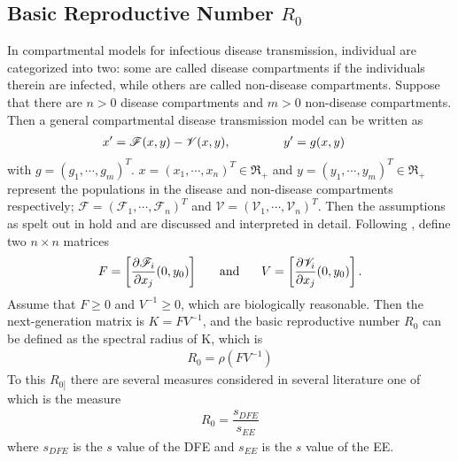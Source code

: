 \subsection{Basic Reproductive Number $ R_{0} $}
In compartmental models for infectious disease transmission, individual are categorized into two: some are called disease compartments if the individuals therein are infected, while others are called non-disease compartments. Suppose that there are $ n > 0 $ disease compartments and $ m > 0 $ non-disease compartments. Then a general compartmental disease transmission model can be written as 
\begin{align}
x' &= \mathscr{F}(x,y) - \mathscr{V}(x,y),\hspace*{1.5cm} y' = g(x,y) \label{NGM1}
\end{align}
with $ g = (g_{1},\cdots, g_{m})^{T} $. $ x = (x_{1},\cdots, x_{n})^{T} \in \Re_{+}$ and $ y = (y_{1},\cdots, y_{m})^{T} \in \Re_{+} $ represent the populations in the disease and non-disease compartments respectively; $ \mathscr{F} = (\mathscr{F}_{1},\cdots, \mathscr{F}_{n})^{T} $ and $ \mathscr{V} = (\mathscr{V}_{1},\cdots, \mathscr{V}_{n})^{T} $. Then the assumptions as spelt out in \parencite{shuai2013global,van2002reproduction,van2008further} hold and are discussed  and interpreted in detail. Following \parencite{van2002reproduction,van2008further}, define two $ n \times n $ matrices
\begin{align}
F = \left[\dfrac{\partial\mathscr{F}_{i}}{\partial x_{j}}(0,y_{0})\right] \hspace*{0.5cm} \text{ and } \hspace*{0.5cm}  V = \left[\dfrac{\partial\mathscr{V}_{i}}{\partial x_{j}}(0,y_{0})\right]. \label{NGM2}
\end{align} 
Assume that $ F \geq 0 $ and $ V^{-1} \geq 0 $, which are biologically reasonable. Then the next-generation matrix is $ K = FV^{-1} $, and the basic reproductive number $ R_{0} $ can be defined as the spectral radius of K, which is
\begin{align}
R_{0} = \rho(FV^{-1}) \label{NGM3}
\end{align}
To this $ R_{0]} $ there are several measures considered in several literature one of which is the measure 
\begin{align}
R_{0} = \dfrac{s_{DFE}}{s_{EE}} \label{NGM4}
\end{align} 
where $ s_{DFE} $ is the $ s $ value of the DFE and $ s_{EE} $ is the $ s $ value of the EE.\\
